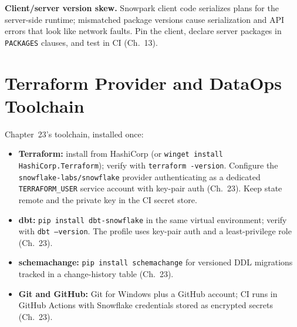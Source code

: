 \begin{pitfall}
\textbf{Client/server version skew.} Snowpark client code serializes plans for the server-side
runtime; mismatched package versions cause serialization and API errors that look like network
faults. Pin the client, declare server packages in \texttt{PACKAGES} clauses, and test in CI
(Ch.~13).
\end{pitfall}

\section{Terraform Provider and DataOps Toolchain}
Chapter~23's toolchain, installed once:
\begin{itemize}
    \item \textbf{Terraform:} install from HashiCorp (or \texttt{winget install
    HashiCorp.Terraform}); verify with \texttt{terraform -version}. Configure the
    \texttt{snowflake-labs/snowflake} provider authenticating as a dedicated
    \texttt{TERRAFORM\_USER} service account with key-pair auth (Ch.~23). Keep state remote and
    the private key in the CI secret store.
    \item \textbf{dbt:} \texttt{pip install dbt-snowflake} in the same virtual environment;
    verify with \texttt{dbt --version}. The profile uses key-pair auth and a
    least-privilege role (Ch.~23).
    \item \textbf{schemachange:} \texttt{pip install schemachange} for versioned DDL migrations
    tracked in a change-history table (Ch.~23).
    \item \textbf{Git and GitHub:} Git for Windows plus a GitHub account; CI runs in GitHub
    Actions with Snowflake credentials stored as encrypted secrets (Ch.~23).
\end{itemize}


